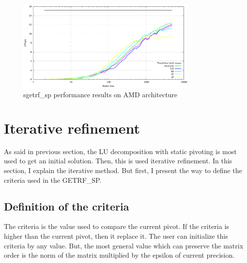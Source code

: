 \documentclass{report}
\begin{document}
\begin{figure}[!ht]
\begin{center}
\includegraphics[width=0.8\textwidth]{exp_sgetrf_sp_amd.png} 
\end{center}
\caption{sgetrf\_sp performance results on AMD architecture}
\end{figure}

\section{Iterative refinement}
As said in previous section, the LU decomposition with static pivoting is most used to get an initial solution. Then, this is used iterative refinement. In this section, I explain the iterative method. But first, I present the way to define the criteria used in the GETRF\_SP.

\subsection{Definition of the criteria}
The criteria is the value used to compare the current pivot. If the criteria is higher than the current pivot, then it replace it. The user can initialize this criteria by any value. But, the most general value which can preserve the matrix order is the norm of the matrix multiplied by the epsilon of current precision.
\end{document}
